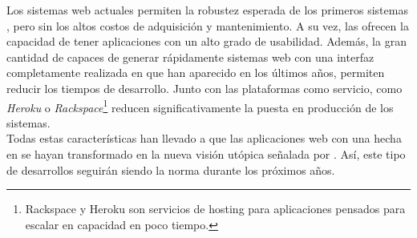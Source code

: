 Los sistemas web actuales permiten la robustez esperada de los primeros sistemas
\mainframe, pero sin los altos costos de adquisición y mantenimiento. A su vez, 
las \rias ofrecen la capacidad de tener aplicaciones con un alto grado de 
usabilidad. Además, la gran cantidad de \frameworks capaces de generar 
rápidamente sistemas web con una interfaz completamente realizada en \htmlv que 
han aparecido en los últimos años, permiten reducir los tiempos de desarrollo. 
Junto con las plataformas como servicio, como \emph{Heroku} o 
\emph{Rackspace}\footnote{
	Rackspace y Heroku son servicios de hosting para aplicaciones pensados para 
	escalar en capacidad en poco tiempo.	
} reducen significativamente la puesta en producción de los sistemas.\\
Todas estas características han llevado a que las aplicaciones web con una 
\viewtier hecha en \htmlv se hayan transformado en la nueva visión utópica 
señalada por \citeauthor{Elliot:2008:BOOK}. Así, este tipo de desarrollos 
seguirán siendo la norma durante los próximos años.